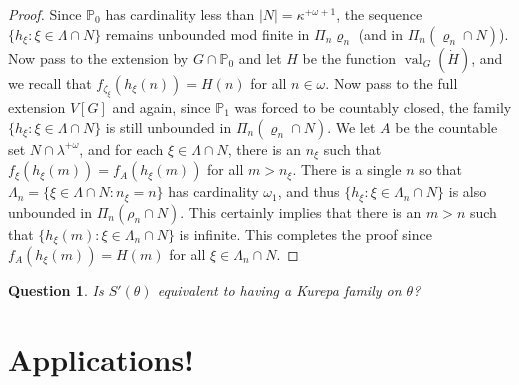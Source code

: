 \documentclass{amsart}
\theoremstyle{plain}
\newtheorem{question}[theorem]{Question}
\theoremstyle{definition}
\theoremstyle{remark}
\theoremstyle{plain}
\theoremstyle{definition}
\theoremstyle{remark}
\begin{document}
\begin{proof}
             Since $\mathbb P_0$ has cardinality less than $|N|=\kappa^{+\omega+1}$,
              the sequence $\{ h_\xi : \xi \in \Lambda\cap N\}$ remains unbounded
              mod finite in $\Pi_n \varrho_n$ (and in
               $\Pi_n (\varrho_n\cap N)$).  Now pass to the extension by
                $G\cap \mathbb P_0$ and let $H$ be the function
                 $\operatorname{val}_{G}(\dot H)$, and we recall
                 that $f_{\zeta_\xi}(h_\xi(n)) = H(n)$ for all $n\in \omega$.
           Now pass to the full extension $V[G]$ and again, since
            $\mathbb P_1$ was forced to be countably closed,
             the family $\{ h_\xi : \xi \in \Lambda\cap N\}$ is still
             unbounded in $\Pi_n (\varrho_n \cap N)$. We let
             $A$ be the countable set $N\cap \lambda^{+\omega}$,
             and for  each
             $\xi\in \Lambda\cap N$, there is an $n_\xi$ such that
              $f_{\xi}(h_\xi(m)) = f_A(h_\xi(m))$ for all $m>n_\xi$.
              There is a single $n$ so that $\Lambda_n
               = \{\xi\in \Lambda\cap N       : n_\xi = n\}$ has cardinality
                $\omega_1 $, and thus
                $\{ h_\xi : \xi\in \Lambda_n\cap N\}$ is also unbounded
                in $\Pi_n (\rho_n\cap N)$.
          This certainly implies that there is an $m>n$
          such that $\{ h_\xi (m) : \xi\in \Lambda_n\cap N\}$ is infinite.
          This completes the proof since  $f_{A}(h_\xi(m)) = H(m)$
          for all $\xi\in \Lambda_n\cap N$.

  \end{proof}

  \begin{question}
    Is \(S'(\theta)\) equivalent to having a Kurepa family on \(\theta\)?
  \end{question}

  \section*{Applications!}
\end{document}
